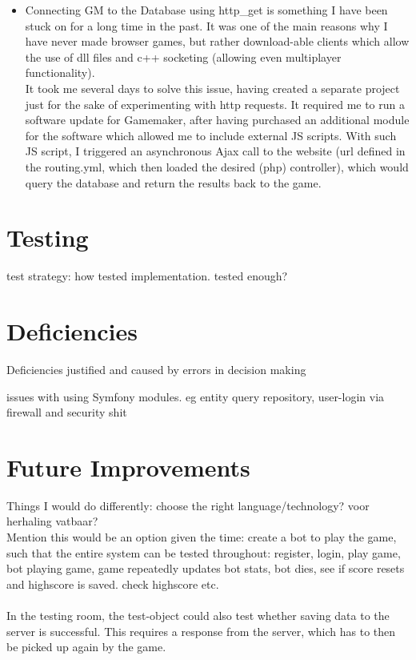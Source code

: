 \documentclass[12pt]{report}
\begin{document}
\begin{itemize}
\item Connecting GM to the Database using http\_get is something I have been stuck on for a long time in the past. It was one of the main reasons why I have never made browser games, but rather download-able clients which allow the use of dll files and c++ socketing (allowing even multiplayer functionality).\\
It took me several days to solve this issue, having created a separate project just for the sake of experimenting with http requests. It required me to run a software update for Gamemaker, after having purchased an additional module for the software which allowed me to include external JS scripts. With such JS script, I triggered an asynchronous Ajax call to the website (url defined in the routing.yml, which then loaded the desired (php) controller), which would query the database and return the results back to the game. 

\end{itemize}

\section*{Testing}
test strategy: how tested implementation. tested enough?

\section*{Deficiencies}
Deficiencies justified and caused by errors in decision making

issues with using Symfony modules. eg entity query repository, user-login via firewall and security shit

\section*{Future Improvements}
Things I would do differently: choose the right language/technology? voor herhaling vatbaar?\\

Mention this would be an option given the time: create a bot to play the game, such that the entire system can be tested throughout: register, login, play game, bot playing game, game repeatedly updates bot stats, bot dies, see if score resets and highscore is saved. check highscore etc.\\
\\
In the testing room, the test-object could also test whether saving data to the server is successful. This requires a response from the server, which has to then be picked up again by the game.
\end{document}
